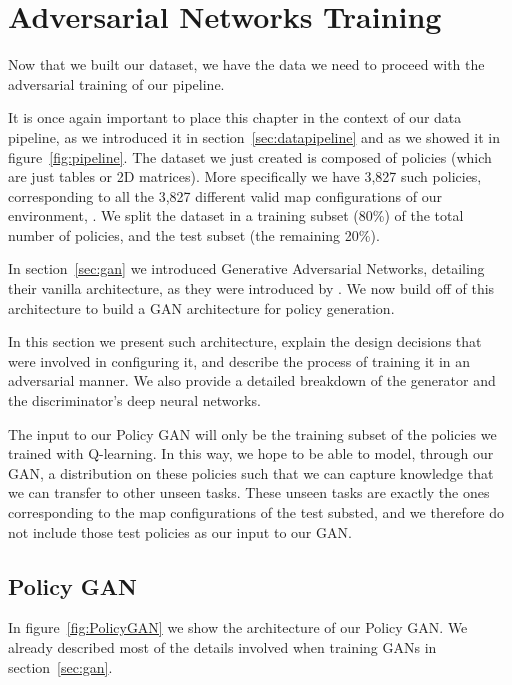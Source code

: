 
\chapter{Adversarial Networks Training} %
\label{Chapter5} %

Now that we built our dataset, we have the data we need to proceed with the adversarial training of our pipeline.

It is once again important to place this chapter in the context of our data pipeline, as we introduced it in section~\ref{sec:datapipeline} and as we showed it in figure~\ref{fig:pipeline}. The dataset we just created is composed of policies (which are just tables or 2D matrices).  More specifically we have 3,827 such policies, corresponding to all the 3,827 different valid map configurations of our environment, . We split the dataset in a training subset (80\%) of the total number of policies, and the test subset (the remaining 20\%).

In section~\ref{sec:gan} we introduced Generative Adversarial Networks, detailing their vanilla architecture, as they were introduced by \citeauthor{goodfellow2014generative}. We now build off of this architecture to build a GAN architecture for policy generation.

In this section we present such architecture, explain the design decisions that were involved in configuring it, and describe the process of training it in an adversarial manner. We also provide a detailed breakdown of the generator and the discriminator's deep neural networks.

The input to our Policy GAN will only be the training subset of the policies we trained with Q-learning. In this way, we hope to be able to model, through our GAN, a distribution on these policies such that we can capture knowledge that we can transfer to other unseen tasks.
These unseen tasks are exactly the ones corresponding to the map configurations of the test substed, and we therefore do not include those test policies as our input to our GAN.


\section{Policy GAN}
In figure~\ref{fig:PolicyGAN} we show the architecture of our Policy GAN.
We already described most of the details involved when training GANs in section~\ref{sec:gan}. 

